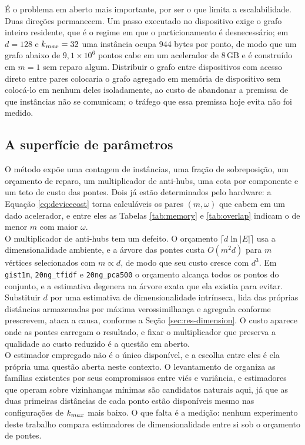É o problema em aberto mais importante, por ser o que limita a escalabilidade. Duas direções permanecem. Um passo executado no dispositivo exige o grafo inteiro residente, que é o regime em que o particionamento é desnecessário; em $d = 128$ e $k_{max} = 32$ uma instância ocupa 944 bytes por ponto, de modo que um grafo abaixo de $9{,}1 \times 10^6$ pontos cabe em um acelerador de 8\,GB e é construído em $m = 1$ sem reparo algum. Distribuir o grafo entre dispositivos com acesso direto entre pares colocaria o grafo agregado em memória de dispositivo sem colocá-lo em nenhum deles isoladamente, ao custo de abandonar a premissa de que instâncias não se comunicam; o tráfego que essa premissa hoje evita não foi medido.\\

\subsection{A superfície de parâmetros\label{sec:fut-params}}

O método expõe uma contagem de instâncias, uma fração de sobreposição, um orçamento de reparo, um multiplicador de anti-hubs, uma cota por componente e um teto de custo das pontes. Dois já estão determinados pelo hardware: a Equação \eqref{eq:devicecost} torna calculáveis os pares $(m, \omega)$ que cabem em um dado acelerador, e entre eles as Tabelas \ref{tab:memory} e \ref{tab:overlap} indicam o de menor $m$ com maior $\omega$.\\

O multiplicador de anti-hubs tem um defeito. O orçamento $\lceil d \ln|E| \rceil$ usa a dimensionalidade ambiente, e a árvore das pontes custa $O(m^2 d)$ para $m$ vértices selecionados com $m \propto d$, de modo que seu custo cresce com $d^3$. Em \texttt{gist1m}, \texttt{20ng\_tfidf} e \texttt{20ng\_pca500} o orçamento alcança todos os pontos do conjunto, e a estimativa degenera na árvore exata que ela existia para evitar. Substituir $d$ por uma estimativa de dimensionalidade intrínseca, lida das próprias distâncias armazenadas por máxima verossimilhança \cite{levina_bickel} e agregada conforme  prescrevem, ataca a causa, conforme a Seção \ref{sec:res-dimension}. O custo aparece onde as pontes carregam o resultado, e fixar o multiplicador que preserva a qualidade ao custo reduzido é a questão em aberto.\\

O estimador empregado não é o único disponível, e a escolha entre eles é ela própria uma questão aberta neste contexto. O levantamento de  organiza as famílias existentes por seus compromissos entre viés e variância, e estimadores que operam sobre vizinhanças mínimas \cite{twonn} são candidatos naturais aqui, já que as duas primeiras distâncias de cada ponto estão disponíveis mesmo nas configurações de $k_{max}$ mais baixo. O que falta é a medição: nenhum experimento deste trabalho compara estimadores de dimensionalidade entre si sob o orçamento de pontes.\\

